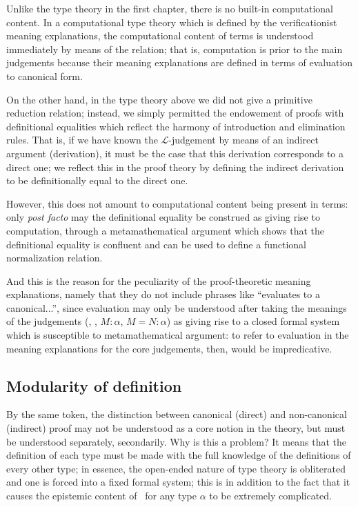 \documentclass[main.tex]{subfiles}
\begin{document}
Unlike the type theory in the first chapter, there is no built-in computational
content. In a computational type theory which is defined by the verificationist
meaning explanations, the computational content of terms is understood
immediately by means of the  relation; that is, computation is
prior to the main judgements because their meaning explanations are defined in
terms of evaluation to canonical form.

On the other hand, in the type theory above we did not give a primitive
reduction relation; instead, we simply permitted the endowement of proofs
with definitional equalities which reflect the harmony of introduction and
elimination rules. That is, if we have known the $\mathcal{L}$-judgement
 by means of an indirect argument (derivation), it must be the case
that this derivation corresponds to a direct one; we reflect this in the
proof theory by defining the indirect derivation to be definitionally equal to
the direct one.

However, this does not amount to computational content being present in terms:
only \emph{post facto} may the definitional equality be construed as giving
rise to computation, through a metamathematical argument which shows that the
definitional equality is confluent and can be used to define a functional
normalization relation.

And this is the reason for the peculiarity of the proof-theoretic meaning
explanations, namely that they do not include phrases like ``evaluates to a
canonical...'', since evaluation may only be understood after taking the
meanings of the judgements (\type\alpha, \type{\alpha=\beta}, $M:\alpha$,
$M=N:\alpha$) as giving rise to a closed formal system which is susceptible to
metamathematical argument: to refer to evaluation in the meaning explanations
for the core judgements, then, would be impredicative.

\subsection{Modularity of definition}

By the same token, the distinction between canonical (direct) and non-canonical
(indirect) proof may not be understood as a core notion in the theory, but must
be understood separately, secondarily. Why is this a problem? It means that the
definition of each type must be made with the full knowledge of the definitions
of every other type; in essence, the open-ended nature of type theory is
obliterated and one is forced into a fixed formal system; this is in addition
to the fact that it causes the epistemic content of \type\alpha\ for any type
$\alpha$ to be extremely complicated.
\end{document}
